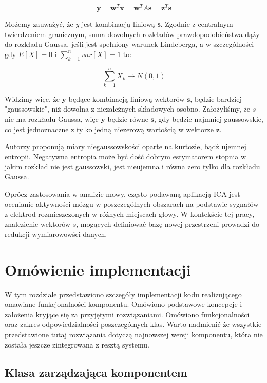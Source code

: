 \documentclass[oneside, eng]{mgr}
\newcommand{\bb}{\textbf}
\begin{document}
\begin{equation}
	\bb{y} = \bb{w}^T \bb{x} = \bb{w}^T A \bb{s} = \bb{z}^T \bb{s} 
\end{equation}

Możemy zauważyć, że $y$ jest kombinacją liniową \bb{s}. Zgodnie z centralnym twierdzeniem granicznym, suma dowolnych rozkładów prawdopodobieństwa dąży do rozkładu Gaussa, jeśli jest spełniony warunek Lindeberga, a w szczególności gdy $E[X] = 0$ i $\sum_{k=1}^{n}var[X] = 1$ to:

\begin{equation}
	\sum_{k=1}^{n} X_k \to N(0,1)
\end{equation}

Widzimy więc, że $\bb{y}$ będące kombinacją liniową wektorów $\bb{s}$, będzie bardziej "gaussowskie", niż dowolna z niezależnych składowych osobno. Założyliśmy, że $s$ nie ma rozkładu Gaussa, więc $\bb{y}$ będzie równe $\bb{s}$, gdy będzie najmniej gaussowskie, co jest jednoznaczne z tylko jedną niezerową wartością w wektorze $\bb{z}$.

Autorzy \cite{ICA} proponują miary niegaussowskości oparte na kurtozie, bądź ujemnej entropii. Negatywna entropia może być dość dobrym estymatorem stopnia w jakim rozkład nie jest gaussowski, jest nieujemna i równa zero tylko dla rozkładu Gaussa.


Oprócz zastosowania w analizie mowy, często podawaną aplikacją ICA jest ocenianie aktywności mózgu w poszczególnych obszarach na podstawie sygnałów z elektrod rozmieszczonych w różnych miejscach głowy. W kontekście tej pracy, znalezienie wektorów $s$, mogących definiować bazę nowej przestrzeni prowadzi do redukcji wymiarowowści danych.

\newpage


\chapter{Omówienie implementacji}

W tym rozdziale przedstawiono szczegóły implementacji kodu realizującego omawiane funkcjonalności komponentu. Omówiono podstawowe koncepcje i założenia kryjące się za przyjętymi rozwiązaniami. Omówiono funkcjonalności oraz zakres odpowiedzialności poszczególnych klas. Warto nadmienić że wszystkie przedstawione tutaj rozwiązania dotyczą najnowszej wersji komponentu, która nie została jeszcze zintegrowana z resztą systemu.

\section{Klasa zarządzająca komponentem}
\end{document}
